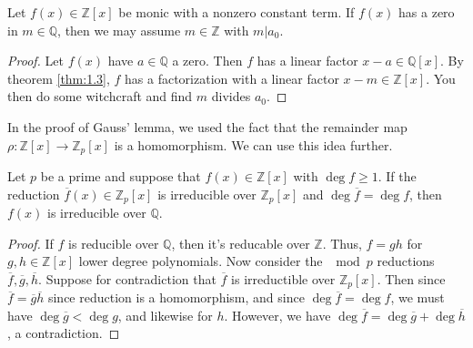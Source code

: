 \begin{corollary}\label{cor:1.3}
	Let $f(x)\in\mathbb{Z} [x]$ be monic with a nonzero constant term. If $f(x)$ has a zero in $m\in\mathbb{Q} $, then we may assume $m\in\mathbb{Z} $ with $m|a_0$.
\end{corollary}
\begin{proof}
	Let $f(x)$ have $a\in\mathbb{Q} $ a zero. Then $f$ has a linear factor $x-a\in\mathbb{Q} [x]$. By theorem \ref{thm:1.3}, $f$ has a factorization with a linear factor  $x-m\in\mathbb{Z}[x] $. You then do some witchcraft and find $m$ divides $a_0$.
\end{proof}

In the proof of Gauss' lemma, we used the fact that the remainder map $\rho : \mathbb{Z} [x] \to \mathbb{Z} _p[x]$ is a homomorphism. We can use this idea further.
\begin{theorem}\label{thm:1.4}
	Let $p$ be a prime and suppose that $f(x)\in\mathbb{Z} [x]$ with $\operatorname{deg} f \geq 1$. If the reduction $\overline{f} (x)\in\mathbb{Z} _p[x]$ is irreducible over $\mathbb{Z} _p[x]$ and $\operatorname{deg} \overline{f} =\operatorname{deg} f$, then $f(x)$ is irreducible over $\mathbb{Q} $.
\end{theorem}
\begin{proof}
	If $f$ is reducible over $\mathbb{Q} $, then it's reducable over $\mathbb{Z} $. Thus, $f=gh$ for $g,h\in\mathbb{Z} [x] $ lower degree polynomials. Now consider the $\mod{p}$ reductions $\overline{f} ,\overline{g} ,\overline{h} $. Suppose for contradiction that $\overline{f} $ is irreductible over $\mathbb{Z}_p[x]$. Then since $\overline{f} =\overline{g} \overline{h} $ since reduction is a homomorphism, and since $\operatorname{deg} \overline{f} =\operatorname{deg} f$, we must have $\operatorname{deg} \overline{g} <\operatorname{deg} g$, and likewise for $h$. However, we have $\operatorname{deg} \overline{f} =\operatorname{deg} \overline{g} +\operatorname{deg} \overline{h} $, a contradiction.
\end{proof}

